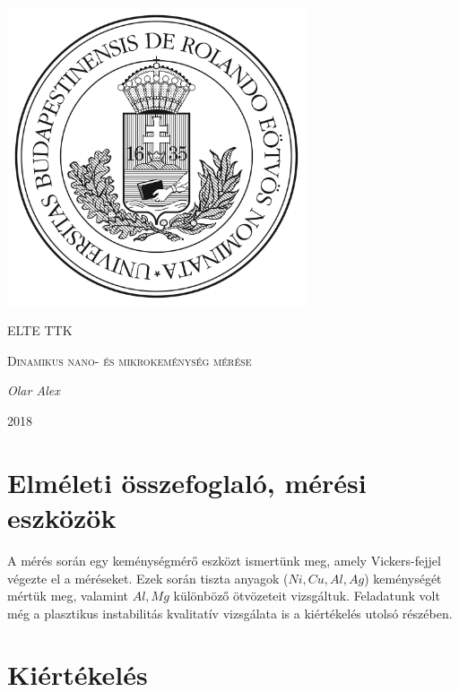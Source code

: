 \documentclass[a4paper,12pt]{article}
\begin{document}
\linespread{1.25}

\begin{titlepage}

	\centering
	\includegraphics[width=0.66\textwidth]{elte.jpg}\par\vspace{1cm}
	{\scshape\LARGE ELTE TTK \par}
	\vspace{3cm}
	{\scshape\Large Dinamikus nano- és mikrokeménység mérése \par}
	\vspace{1cm}
	{\large\itshape Olar Alex\par}
	\vspace{3cm}
	{\large 2018 \par}
	
\end{titlepage}

\tableofcontents

\newpage

\section{Elméleti összefoglaló, mérési eszközök}

\par A mérés során egy keménységmérő eszközt ismertünk meg, amely Vickers-fejjel végezte el a méréseket. Ezek során tiszta anyagok ($Ni, Cu, Al, Ag$) keménységét mértük meg, valamint $Al, Mg$ különböző ötvözeteit vizsgáltuk. Feladatunk volt még a plasztikus instabilitás kvalitatív vizsgálata is a kiértékelés utolsó részében.

\section{Kiértékelés}
\end{document}
